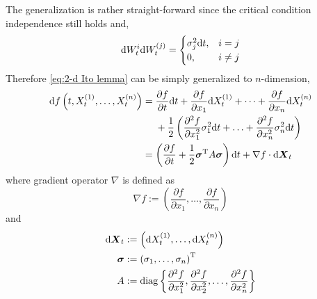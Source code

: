 \documentclass{homework}
\newcommand{\trans}{\mathrm T}
\begin{document}
\begin{subproblem}[(\alph*)]
        \item
        The generalization is rather straight-forward since
        the critical condition independence still holds and,
        \[\mathrm d W_t^{i}\mathrm d W_t^{(j)}=
        \begin{cases}
            \sigma_j^2\mathrm d t,&i=j\\
            0,&i\neq j
        \end{cases}\]
        Therefore \cref{eq:2-d Ito lemma} can be simply generalized
        to $n$-dimension,
        \begin{equation*}
            \begin{aligned}
            \diff f\left(t,X_t^{(1)},\ldots,X_t^{(n)}\right)&=
            \begin{aligned}[t]
            &\frac{\partial f}{\partial t}\diff t
            +\frac{\partial f}{\partial x_1}\diff X_t^{(1)}
            +\cdots
            +\frac{\partial f}{\partial x_n}\diff X_t^{(n)}\\
            &+\frac{1}{2}\left(
                \frac{\partial^2 f}{\partial x_1^2}\sigma_1^2\diff t
                +\ldots
                +\frac{\partial^2 f}{\partial x_n^2}\sigma_n^2\diff t
            \right)
            \end{aligned}\\
            &=\left(\frac{\partial f}{\partial t}
            +\frac{1}{2}\boldsymbol\sigma^\trans A\boldsymbol\sigma\right)\diff t
            +\nabla f\cdot\diff\boldsymbol X_t
            \end{aligned}
        \end{equation*}
        where gradient operator $\nabla$ is defined as
        \[\nabla f:=\left(\frac{\partial f}{\partial x_1},\ldots,\frac{\partial f}{\partial x_n}\right)\]
        and
        \[\begin{aligned}
            \diff\boldsymbol X_t&:=
            \left(\diff X_t^{(1)},\ldots,\diff X_t^{(n)}\right)\\
            \boldsymbol\sigma&:=
            \left(\sigma_1,\ldots,\sigma_n\right)^\trans\\
            A&:=\mathrm{diag}\left\{\frac{\partial^2 f}{\partial x_1^2},
           \frac{\partial^2 f}{\partial x_2^2},\ldots,
           \frac{\partial^2 f}{\partial x_n^2}\right\}
        \end{aligned}\]
        

\end{subproblem}
\end{document}
